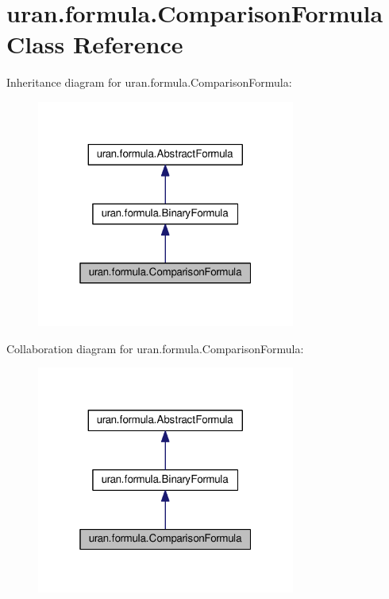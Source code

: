 \hypertarget{classuran_1_1formula_1_1_comparison_formula}{}\section{uran.\+formula.\+Comparison\+Formula Class Reference}
\label{classuran_1_1formula_1_1_comparison_formula}


Inheritance diagram for uran.\+formula.\+Comparison\+Formula\+:
\nopagebreak
\begin{figure}[H]
\begin{center}
\leavevmode
\includegraphics[width=241pt]{classuran_1_1formula_1_1_comparison_formula__inherit__graph}
\end{center}
\end{figure}


Collaboration diagram for uran.\+formula.\+Comparison\+Formula\+:
\nopagebreak
\begin{figure}[H]
\begin{center}
\leavevmode
\includegraphics[width=241pt]{classuran_1_1formula_1_1_comparison_formula__coll__graph}
\end{center}
\end{figure}
